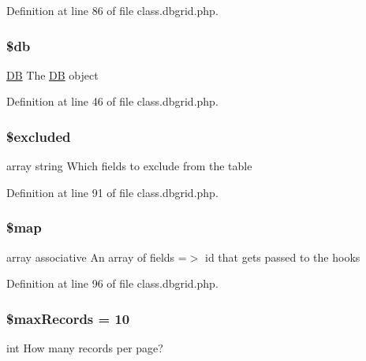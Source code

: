 Definition at line 86 of file class.\-dbgrid.\-php.

\hypertarget{class_db_grid_a1fa3127fc82f96b1436d871ef02be319}{
\subsubsection[{\$db}]{\setlength{\rightskip}{0pt plus 5cm}\$db\hspace{0.3cm}{\ttfamily [protected]}}}\label{class_db_grid_a1fa3127fc82f96b1436d871ef02be319}
\hyperlink{class_d_b}{D\-B} The \hyperlink{class_d_b}{D\-B} object 

Definition at line 46 of file class.\-dbgrid.\-php.

\hypertarget{class_db_grid_a461d2a3e41e45e6ced688a7ae506c407}{
\subsubsection[{\$excluded}]{\setlength{\rightskip}{0pt plus 5cm}\$excluded\hspace{0.3cm}{\ttfamily [protected]}}}\label{class_db_grid_a461d2a3e41e45e6ced688a7ae506c407}
array string Which fields to exclude from the table 

Definition at line 91 of file class.\-dbgrid.\-php.

\hypertarget{class_db_grid_acdcfcd6e65900bdadd894106750cf520}{
\subsubsection[{\$map}]{\setlength{\rightskip}{0pt plus 5cm}\$map\hspace{0.3cm}{\ttfamily [protected]}}}\label{class_db_grid_acdcfcd6e65900bdadd894106750cf520}
array associative An array of fields =$>$ id that gets passed to the hooks 

Definition at line 96 of file class.\-dbgrid.\-php.

\hypertarget{class_db_grid_ad48e2eb22ba0d9bef2ad4d665d9784b2}{
\subsubsection[{\$max\-Records}]{\setlength{\rightskip}{0pt plus 5cm}\$max\-Records = 10}}\label{class_db_grid_ad48e2eb22ba0d9bef2ad4d665d9784b2}
int How many records per page? 

